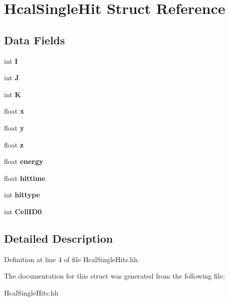 \section{Hcal\-Single\-Hit Struct Reference}
\label{structHcalSingleHit}
\subsection*{Data Fields}
\begin{DoxyCompactItemize}
\item 
int {\bfseries I}\label{structHcalSingleHit_ab8c785a4cf4d343ad7e107cbb4ef737d}

\item 
int {\bfseries J}\label{structHcalSingleHit_a28f963e1b6afb63f68b824edf25e171b}

\item 
int {\bfseries K}\label{structHcalSingleHit_acaae346035a5bf06db83b34f0dd794b4}

\item 
float {\bfseries x}\label{structHcalSingleHit_ad7efe549fc3d0edf935f0eff913ab715}

\item 
float {\bfseries y}\label{structHcalSingleHit_a1f42473073dc1eedc9c356118580f8da}

\item 
float {\bfseries z}\label{structHcalSingleHit_a64a006c07bf06ce1fee5666630cfd6d7}

\item 
float {\bfseries energy}\label{structHcalSingleHit_a42b6143ec67442d89723416d5172f868}

\item 
float {\bfseries hittime}\label{structHcalSingleHit_a52d543104083887e9c44257fe4b6b956}

\item 
int {\bfseries hittype}\label{structHcalSingleHit_a09d33f63cd72d0ac0e137d0c0cda298e}

\item 
int {\bfseries Cell\-I\-D0}\label{structHcalSingleHit_aec5d1fcebcf983054bb4de6ae5ba79f8}

\end{DoxyCompactItemize}


\subsection{Detailed Description}


Definition at line 4 of file Hcal\-Single\-Hits.\-hh.



The documentation for this struct was generated from the following file\-:\begin{DoxyCompactItemize}
\item 
Hcal\-Single\-Hits.\-hh\end{DoxyCompactItemize}
